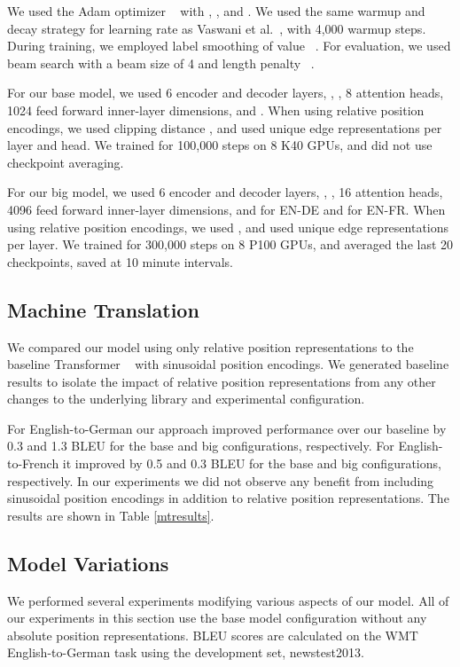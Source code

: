 \documentclass[11pt,a4paper]{article}
\begin{document}
We used the Adam optimizer ~\cite{kingma2014} with , , and . We used the same warmup and decay strategy for learning rate as Vaswani et
al.~, with 4,000 warmup steps.
During training, we employed label smoothing of value  ~\cite{szegedy2016}.
For evaluation, we used beam search with a beam size of 4 and length penalty  ~\cite{wu2016}.

For our base model, we used 6 encoder and decoder layers, , , 8 attention heads, 1024 feed forward inner-layer dimensions,
and .
When using relative position encodings, we used clipping distance ,
and used unique edge representations per layer and head. We trained for 100,000 steps on 8 K40 GPUs,
and did not use checkpoint averaging.

For our big model, we used 6 encoder and decoder layers, , , 16 attention heads, 4096 feed forward inner-layer dimensions, and  for EN-DE and  for EN-FR.
When using relative position encodings, we used , and used unique edge representations per layer.
We trained for 300,000 steps on 8 P100 GPUs, and averaged the last 20 checkpoints, saved at 10 minute intervals.

\subsection{Machine Translation}

We compared our model using only relative position representations to the baseline Transformer ~\cite{vaswani2017} with sinusoidal position encodings.
We generated baseline results to isolate the impact of relative position representations from any other changes to the underlying library and experimental configuration.

For English-to-German our approach improved performance over our baseline by 0.3 and 1.3 BLEU for the base and big configurations, respectively.
For English-to-French it improved by 0.5 and 0.3 BLEU for the base and big configurations, respectively.
In our experiments we did not observe any benefit from including sinusoidal position encodings in addition to relative position representations. The results are shown in Table \ref{mtresults}.


\subsection{Model Variations}\label{secmodelvariations}

We performed several experiments modifying various aspects of our model.
All of our experiments in this section use the base model configuration without any absolute position representations. BLEU scores are calculated on the WMT English-to-German task using the development set, newstest2013. 
\end{document}
